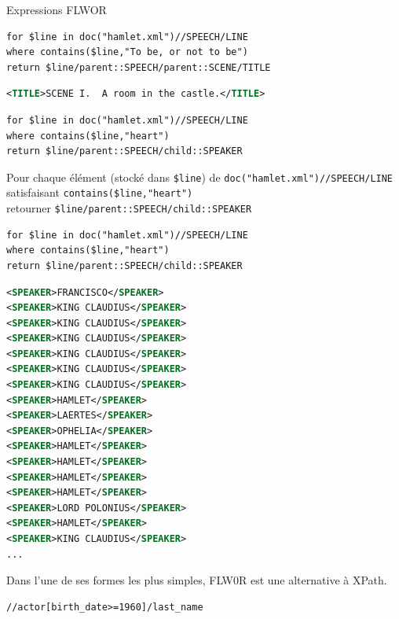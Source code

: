 \begin{frame}{Expressions FLWOR }
\bigskip

\begin{lstlisting}
for $line in doc("hamlet.xml")//SPEECH/LINE
where contains($line,"To be, or not to be")
return $line/parent::SPEECH/parent::SCENE/TITLE
\end{lstlisting}


\begin{lstlisting}[language=XML]
<TITLE>SCENE I.  A room in the castle.</TITLE>
\end{lstlisting}

\framebreak 

\begin{lstlisting}
for $line in doc("hamlet.xml")//SPEECH/LINE
where contains($line,"heart")
return $line/parent::SPEECH/child::SPEAKER
\end{lstlisting}

\medskip
 
Pour chaque élément (stocké dans \lstinline!$line!) de \lstinline!doc("hamlet.xml")//SPEECH/LINE! \\
satisfaisant \lstinline!contains($line,"heart")! \\
retourner \lstinline!$line/parent::SPEECH/child::SPEAKER!

\framebreak

\begin{lstlisting}
for $line in doc("hamlet.xml")//SPEECH/LINE
where contains($line,"heart")
return $line/parent::SPEECH/child::SPEAKER
\end{lstlisting}

\begin{lstlisting}[language=XML,basicstyle=\tiny]
<SPEAKER>FRANCISCO</SPEAKER>
<SPEAKER>KING CLAUDIUS</SPEAKER>
<SPEAKER>KING CLAUDIUS</SPEAKER>
<SPEAKER>KING CLAUDIUS</SPEAKER>
<SPEAKER>KING CLAUDIUS</SPEAKER>
<SPEAKER>KING CLAUDIUS</SPEAKER>
<SPEAKER>KING CLAUDIUS</SPEAKER>
<SPEAKER>HAMLET</SPEAKER>
<SPEAKER>LAERTES</SPEAKER>
<SPEAKER>OPHELIA</SPEAKER>
<SPEAKER>HAMLET</SPEAKER>
<SPEAKER>HAMLET</SPEAKER>
<SPEAKER>HAMLET</SPEAKER>
<SPEAKER>HAMLET</SPEAKER>
<SPEAKER>LORD POLONIUS</SPEAKER>
<SPEAKER>HAMLET</SPEAKER>
<SPEAKER>KING CLAUDIUS</SPEAKER>
...
\end{lstlisting}

\framebreak

Dans l'une de ses formes les plus simples, FLW0R est une alternative à XPath.

\begin{lstlisting}
//actor[birth_date>=1960]/last_name
\end{lstlisting}


\end{frame}
